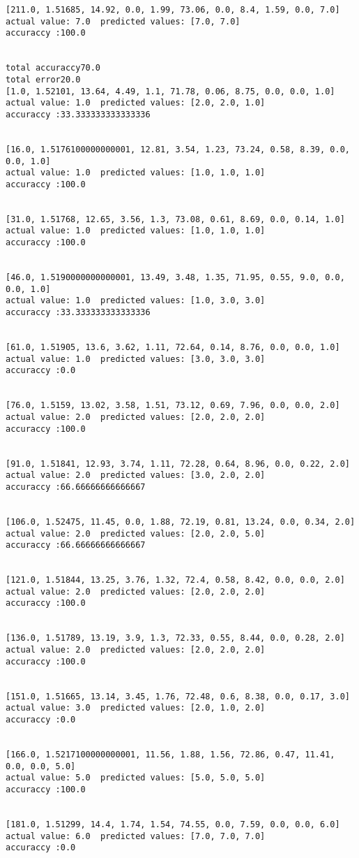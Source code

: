 \documentclass[11pt]{article}
\begin{document}
\begin{Verbatim}[commandchars=\\\{\}]
[211.0, 1.51685, 14.92, 0.0, 1.99, 73.06, 0.0, 8.4, 1.59, 0.0, 7.0]
actual value: 7.0  predicted values: [7.0, 7.0]
accuraccy :100.0


total accuraccy70.0
total error20.0
[1.0, 1.52101, 13.64, 4.49, 1.1, 71.78, 0.06, 8.75, 0.0, 0.0, 1.0]
actual value: 1.0  predicted values: [2.0, 2.0, 1.0]
accuraccy :33.333333333333336


[16.0, 1.5176100000000001, 12.81, 3.54, 1.23, 73.24, 0.58, 8.39, 0.0, 0.0, 1.0]
actual value: 1.0  predicted values: [1.0, 1.0, 1.0]
accuraccy :100.0


[31.0, 1.51768, 12.65, 3.56, 1.3, 73.08, 0.61, 8.69, 0.0, 0.14, 1.0]
actual value: 1.0  predicted values: [1.0, 1.0, 1.0]
accuraccy :100.0


[46.0, 1.5190000000000001, 13.49, 3.48, 1.35, 71.95, 0.55, 9.0, 0.0, 0.0, 1.0]
actual value: 1.0  predicted values: [1.0, 3.0, 3.0]
accuraccy :33.333333333333336


[61.0, 1.51905, 13.6, 3.62, 1.11, 72.64, 0.14, 8.76, 0.0, 0.0, 1.0]
actual value: 1.0  predicted values: [3.0, 3.0, 3.0]
accuraccy :0.0


[76.0, 1.5159, 13.02, 3.58, 1.51, 73.12, 0.69, 7.96, 0.0, 0.0, 2.0]
actual value: 2.0  predicted values: [2.0, 2.0, 2.0]
accuraccy :100.0


[91.0, 1.51841, 12.93, 3.74, 1.11, 72.28, 0.64, 8.96, 0.0, 0.22, 2.0]
actual value: 2.0  predicted values: [3.0, 2.0, 2.0]
accuraccy :66.66666666666667


[106.0, 1.52475, 11.45, 0.0, 1.88, 72.19, 0.81, 13.24, 0.0, 0.34, 2.0]
actual value: 2.0  predicted values: [2.0, 2.0, 5.0]
accuraccy :66.66666666666667


[121.0, 1.51844, 13.25, 3.76, 1.32, 72.4, 0.58, 8.42, 0.0, 0.0, 2.0]
actual value: 2.0  predicted values: [2.0, 2.0, 2.0]
accuraccy :100.0


[136.0, 1.51789, 13.19, 3.9, 1.3, 72.33, 0.55, 8.44, 0.0, 0.28, 2.0]
actual value: 2.0  predicted values: [2.0, 2.0, 2.0]
accuraccy :100.0


[151.0, 1.51665, 13.14, 3.45, 1.76, 72.48, 0.6, 8.38, 0.0, 0.17, 3.0]
actual value: 3.0  predicted values: [2.0, 1.0, 2.0]
accuraccy :0.0


[166.0, 1.5217100000000001, 11.56, 1.88, 1.56, 72.86, 0.47, 11.41, 0.0, 0.0, 5.0]
actual value: 5.0  predicted values: [5.0, 5.0, 5.0]
accuraccy :100.0


[181.0, 1.51299, 14.4, 1.74, 1.54, 74.55, 0.0, 7.59, 0.0, 0.0, 6.0]
actual value: 6.0  predicted values: [7.0, 7.0, 7.0]
accuraccy :0.0



\end{Verbatim}
\end{document}
